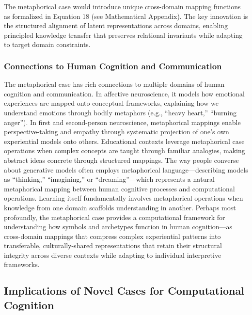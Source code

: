 The metaphorical case would introduce unique cross-domain mapping
functions as formalized in Equation 18 (see Mathematical Appendix). The
key innovation is the structured alignment of latent representations
across domains, enabling principled knowledge transfer that preserves
relational invariants while adapting to target domain constraints.

\hypertarget{connections-to-human-cognition-and-communication}{%
\subsubsection{Connections to Human Cognition and
Communication}\label{connections-to-human-cognition-and-communication}}

The metaphorical case has rich connections to multiple domains of human
cognition and communication. In affective neuroscience, it models how
emotional experiences are mapped onto conceptual frameworks, explaining
how we understand emotions through bodily metaphors (e.g., ``heavy
heart,'' ``burning anger''). In first and second-person neuroscience,
metaphorical mappings enable perspective-taking and empathy through
systematic projection of one's own experiential models onto others.
Educational contexts leverage metaphorical case operations when complex
concepts are taught through familiar analogies, making abstract ideas
concrete through structured mappings. The way people converse about
generative models often employs metaphorical language---describing
models as ``thinking,'' ``imagining,'' or ``dreaming''---which
represents a natural metaphorical mapping between human cognitive
processes and computational operations. Learning itself fundamentally
involves metaphorical operations when knowledge from one domain
scaffolds understanding in another. Perhaps most profoundly, the
metaphorical case provides a computational framework for understanding
how symbols and archetypes function in human cognition---as cross-domain
mappings that compress complex experiential patterns into transferable,
culturally-shared representations that retain their structural integrity
across diverse contexts while adapting to individual interpretive
frameworks.

\hypertarget{implications-of-novel-cases-for-computational-cognition}{%
\subsection{Implications of Novel Cases for Computational
Cognition}\label{implications-of-novel-cases-for-computational-cognition}}

